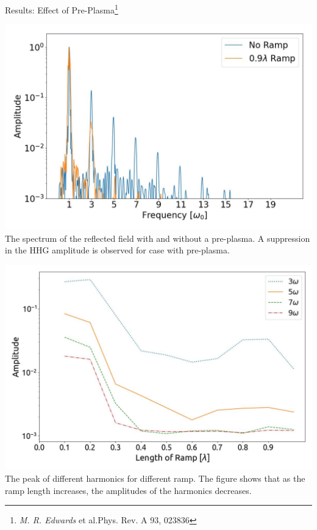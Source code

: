 \documentclass{beamer}
\begin{document}
\begin{frame}{Results: Effect of  Pre-Plasma\footnote{\textit{M. R. Edwards} et al.Phys. Rev. A 93, 023836}}
    \begin{minipage}[h]{0.48\linewidth}
        \centering
        \includegraphics[width=1\textwidth, height=0.55\textheight]{images/ramp.jpg}
        \scriptsize{The spectrum of the reflected field with and without a pre-plasma. A suppression in the HHG amplitude is observed for case with pre-plasma.}
        \label{fig:ramp}
    \end{minipage}
    \begin{minipage}[h]{0.48\linewidth}
        \centering
        \includegraphics[width=1\textwidth, height=0.55\textheight]{images/ramp_7600.jpg}
        \scriptsize{The peak of different harmonics for different ramp. The figure shows that as the ramp length increases, the amplitudes of the harmonics decreases.}
        \label{fig:ramp-peaks}
    \end{minipage}
\end{frame}
\end{document}
